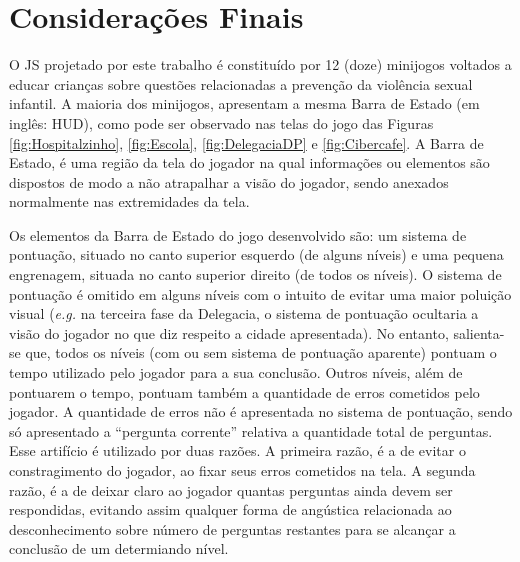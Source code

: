 
\section{Considerações Finais}\label{sec:fim}

O \acf{JS} projetado por este trabalho é constituído por 12 (doze) minijogos voltados a educar crianças sobre questões relacionadas a prevenção da violência sexual infantil. A maioria dos minijogos, apresentam a mesma Barra de Estado (em inglês: \acl{HUD}), como pode ser observado nas telas do jogo das Figuras \ref{fig:Hospitalzinho}, \ref{fig:Escola}, \ref{fig:DelegaciaDP} e \ref{fig:Cibercafe}. A Barra de Estado, é uma região da tela do jogador na qual informações ou elementos são dispostos de modo a não atrapalhar a visão do jogador, sendo anexados normalmente nas extremidades da tela. %

Os elementos da Barra de Estado do jogo desenvolvido são: um sistema de pontuação, situado no canto superior esquerdo (de alguns níveis) e uma pequena engrenagem, situada no canto superior direito (de todos os níveis). O sistema de pontuação é omitido em alguns níveis com o intuito de evitar uma maior poluição visual (\textit{e.g.} na terceira fase da Delegacia, o sistema de pontuação ocultaria a visão do jogador no que diz respeito a cidade apresentada). No entanto, salienta-se que, todos os níveis (com ou sem sistema de pontuação aparente) pontuam o tempo utilizado pelo jogador para a sua conclusão. Outros níveis, além de pontuarem o tempo, pontuam também a quantidade de erros cometidos pelo jogador. A quantidade de erros não é apresentada no sistema de pontuação, sendo só apresentado a ``pergunta corrente'' relativa a quantidade total de perguntas. Esse artifício é utilizado por duas razões. A primeira razão, é a de evitar o constragimento do jogador, ao fixar seus erros cometidos na tela. A segunda razão, é a de deixar claro ao jogador quantas perguntas ainda devem ser respondidas, evitando assim qualquer forma de angústica relacionada ao desconhecimento sobre número de perguntas restantes para se alcançar a conclusão de um determiando nível.

